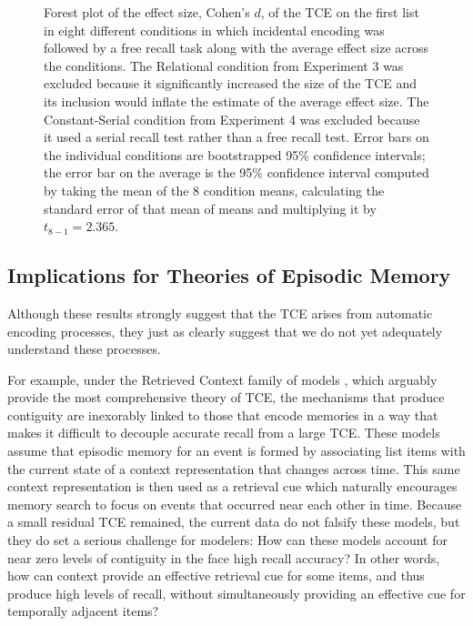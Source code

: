 \documentclass[man,natbib,floatsintext]{apa6} %
\begin{document}
\begin{figure}%
\caption{Forest plot of the effect size, Cohen's $d$, of the TCE on the first list in eight different conditions in which incidental encoding was followed by a free recall task along with the average effect size across the conditions. The Relational condition from Experiment 3 was excluded because it significantly increased the size of the TCE and its inclusion would inflate the estimate of the average effect size. The Constant-Serial condition from Experiment 4 was excluded because it used a serial recall test rather than a free recall test. Error bars on the individual conditions are bootstrapped 95\% confidence intervals; the error bar on the average is the 95\% confidence interval computed by taking the mean of the 8 condition means, calculating the standard error of that mean of means and multiplying it by $t_{8-1}=2.365$.}
\label{meta}
\end{figure}


\subsection{Implications for Theories of Episodic Memory}
Although these results strongly suggest that the TCE arises from automatic encoding processes, they just as clearly suggest that we do not yet adequately understand these processes.

For example, under the Retrieved Context family of models \citep[e.g.,][]{PolyEtal09,LohnEtal14,HealKaha15}, which arguably provide the most comprehensive theory of TCE, the mechanisms that produce contiguity are inexorably linked to those that encode memories in a way that makes it difficult to decouple accurate recall from a large TCE. These models assume that episodic memory for an event is formed by associating list items with the current state of a context representation that changes across time. This same context representation is then used as a retrieval cue which naturally encourages memory search to focus on events that occurred near each other in time. Because a small residual TCE remained, the current data do not falsify these models, but they do set a serious challenge for modelers: How can these models account for near zero levels of contiguity in the face high recall accuracy? In other words, how can context provide an effective retrieval cue for some items, and thus produce high levels of recall, without simultaneously providing an effective cue for temporally adjacent items?
\end{document}
